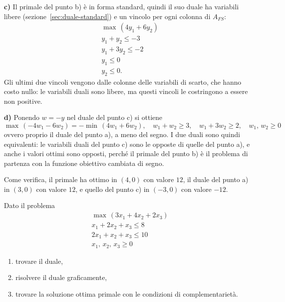 \textbf{c)} Il primale del punto b) è in forma standard, quindi il suo duale ha variabili libere (sezione~\ref{sec:duale-standard}) e un vincolo per ogni colonna di $A_{FS}$:
\[
\begin{aligned}
&\max\, (4y_1 + 6y_2) \\
&y_1 + y_2 \le -3 \\
&y_1 + 3y_2 \le -2 \\
&y_1 \le 0 \\
&y_2 \le 0.
\end{aligned}
\]
Gli ultimi due vincoli vengono dalle colonne delle variabili di scarto, che hanno costo nullo: le variabili duali sono libere, ma questi vincoli le costringono a essere non positive.

\textbf{d)} Ponendo $w = -y$ nel duale del punto c) si ottiene
\[
\max\, (-4w_1 - 6w_2) = -\min\, (4w_1 + 6w_2), \quad w_1 + w_2 \ge 3, \quad w_1 + 3w_2 \ge 2, \quad w_1,\, w_2 \ge 0
\]
ovvero proprio il duale del punto a), a meno del segno. I due duali sono quindi equivalenti: le variabili duali del punto c) sono le opposte di quelle del punto a), e anche i valori ottimi sono opposti, perché il primale del punto b) è il problema di partenza con la funzione obiettivo cambiata di segno.

Come verifica, il primale ha ottimo in $(4, 0)$ con valore $12$, il duale del punto a) in $(3, 0)$ con valore $12$, e quello del punto c) in $(-3, 0)$ con valore $-12$.

\begin{esercizio}
Dato il problema
\[
\begin{aligned}
&\max\, (3x_1 + 4x_2 + 2x_3) \\
&x_1 + 2x_2 + x_3 \le 8 \\
&2x_1 + x_2 + x_3 \le 10 \\
&x_1,\, x_2,\, x_3 \ge 0
\end{aligned}
\]
\begin{enumerate}[label=\alph*)]
    \item trovare il duale,
    \item risolvere il duale graficamente,
    \item trovare la soluzione ottima primale con le condizioni di complementarietà.
\end{enumerate}
\end{esercizio}

